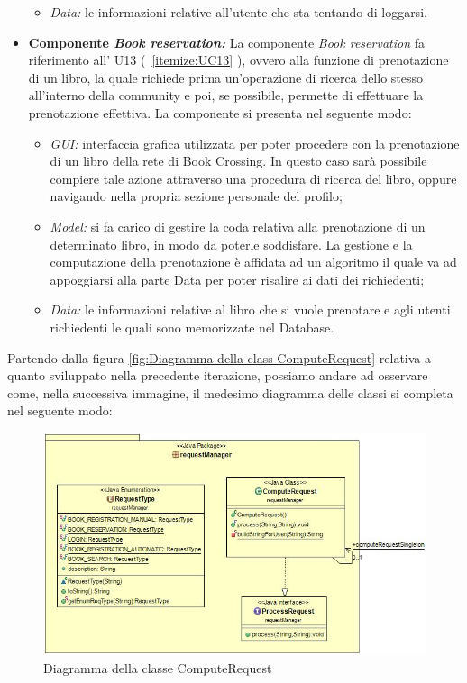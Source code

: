 \begin{itemize}
\begin{itemize}
		\item \textit{Data:} le informazioni relative all'utente che sta tentando di loggarsi.
	\end{itemize}
	\item \textbf{Componente \textit{Book reservation:}}  La componente \textit{Book reservation} fa riferimento all’ U13 (~\ref{itemize:UC13} ), ovvero alla funzione di prenotazione di un libro, la quale richiede prima un'operazione di ricerca dello stesso all'interno della community e poi, se possibile, permette di effettuare la prenotazione  effettiva. La componente si presenta nel seguente modo:
	\begin{itemize}
		\item \textit{GUI:} interfaccia grafica utilizzata per poter procedere con la prenotazione di un libro della rete di Book Crossing. In questo caso sarà possibile compiere tale azione attraverso una procedura di ricerca del libro, oppure navigando nella propria sezione personale del profilo;
		\item \textit{Model:} si fa carico di gestire la coda relativa alla prenotazione di un determinato libro, in modo da poterle soddisfare. La gestione e la computazione della prenotazione è affidata ad un algoritmo il quale va ad appoggiarsi alla parte Data per poter risalire ai dati dei richiedenti;
		\item \textit{Data:} le informazioni relative al libro che si vuole prenotare e agli utenti richiedenti le quali sono memorizzate nel Database.
	\end{itemize}
\end{itemize}
Partendo dalla figura \ref{fig:Diagramma della class ComputeRequest} relativa a quanto sviluppato nella precedente iterazione, possiamo andare ad osservare come, nella successiva immagine, il medesimo diagramma delle classi si completa nel seguente modo:
\begin{figure}[h]
	\includegraphics[width=\textwidth]{Immagini/UML_ComputeRequestServer2}
	\caption{Diagramma della classe ComputeRequest}
	\label{fig:Diagramma della class ComputeRequest2}
\end{figure}
